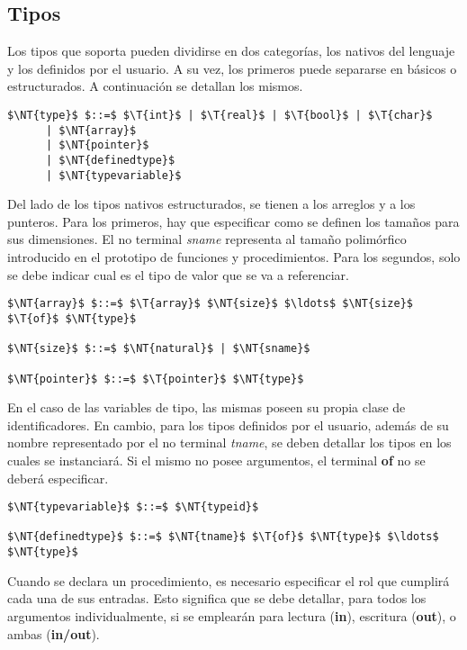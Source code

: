 \subsection{Tipos}

Los tipos que soporta \Lenguaje{} pueden dividirse en dos categorías, los nativos del lenguaje y los definidos por el usuario.
A su vez, los primeros puede separarse en básicos o estructurados.
A continuación se detallan los mismos.

\begin{lstlisting}[style = syntax]
$\NT{type}$ $::=$ $\T{int}$ | $\T{real}$ | $\T{bool}$ | $\T{char}$
      | $\NT{array}$
      | $\NT{pointer}$
      | $\NT{definedtype}$
      | $\NT{typevariable}$
\end{lstlisting}

Del lado de los tipos nativos estructurados, se tienen a los arreglos y a los punteros.
Para los primeros, hay que especificar como se definen los tamaños para sus dimensiones.
El no terminal \textit{sname} representa al tamaño polimórfico introducido en el prototipo de funciones y procedimientos.
Para los segundos, solo se debe indicar cual es el tipo de valor que se va a referenciar. 

\begin{lstlisting}[style = syntax]
$\NT{array}$ $::=$ $\T{array}$ $\NT{size}$ $\ldots$ $\NT{size}$ $\T{of}$ $\NT{type}$

$\NT{size}$ $::=$ $\NT{natural}$ | $\NT{sname}$

$\NT{pointer}$ $::=$ $\T{pointer}$ $\NT{type}$
\end{lstlisting}

En el caso de las variables de tipo, las mismas poseen su propia clase de identificadores.
En cambio, para los tipos definidos por el usuario, además de su nombre representado por el no terminal \textit{tname}, se deben detallar los tipos en los cuales se instanciará.
Si el mismo no posee argumentos, el terminal \textbf{of} no se deberá especificar.

\begin{lstlisting}[style = syntax]
$\NT{typevariable}$ $::=$ $\NT{typeid}$

$\NT{definedtype}$ $::=$ $\NT{tname}$ $\T{of}$ $\NT{type}$ $\ldots$ $\NT{type}$
\end{lstlisting}

Cuando se declara un procedimiento, es necesario especificar el rol que cumplirá cada una de sus entradas.
Esto significa que se debe detallar, para todos los argumentos individualmente, si se emplearán para lectura (\textbf{in}), escritura (\textbf{out}), o ambas (\textbf{in/out}).

